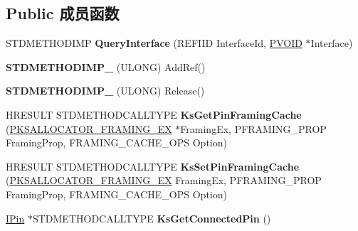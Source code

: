 \subsection*{Public 成员函数}
\begin{DoxyCompactItemize}
\item 
\mbox{\label{class_c_input_pin_a1411cd48b7dc135d980f56313519e106}} 
S\+T\+D\+M\+E\+T\+H\+O\+D\+I\+MP {\bfseries Query\+Interface} (R\+E\+F\+I\+ID Interface\+Id, \hyperlink{interfacevoid}{P\+V\+O\+ID} $\ast$Interface)
\item 
\mbox{\label{class_c_input_pin_a711a63c063067096b61be4d7bce940d7}} 
{\bfseries S\+T\+D\+M\+E\+T\+H\+O\+D\+I\+M\+P\+\_\+} (U\+L\+O\+NG) Add\+Ref()
\item 
\mbox{\label{class_c_input_pin_ac2713ee7beb47db650c95cd751c44d8d}} 
{\bfseries S\+T\+D\+M\+E\+T\+H\+O\+D\+I\+M\+P\+\_\+} (U\+L\+O\+NG) Release()
\item 
\mbox{\label{class_c_input_pin_a782a6def2d8a0433b147b9cd5c808eeb}} 
H\+R\+E\+S\+U\+LT S\+T\+D\+M\+E\+T\+H\+O\+D\+C\+A\+L\+L\+T\+Y\+PE {\bfseries Ks\+Get\+Pin\+Framing\+Cache} (\hyperlink{struct_k_s_a_l_l_o_c_a_t_o_r___f_r_a_m_i_n_g___e_x}{P\+K\+S\+A\+L\+L\+O\+C\+A\+T\+O\+R\+\_\+\+F\+R\+A\+M\+I\+N\+G\+\_\+\+EX} $\ast$Framing\+Ex, P\+F\+R\+A\+M\+I\+N\+G\+\_\+\+P\+R\+OP Framing\+Prop, F\+R\+A\+M\+I\+N\+G\+\_\+\+C\+A\+C\+H\+E\+\_\+\+O\+PS Option)
\item 
\mbox{\label{class_c_input_pin_a9aa7a402f9fcc1a4fbfac5da9c9cf75f}} 
H\+R\+E\+S\+U\+LT S\+T\+D\+M\+E\+T\+H\+O\+D\+C\+A\+L\+L\+T\+Y\+PE {\bfseries Ks\+Set\+Pin\+Framing\+Cache} (\hyperlink{struct_k_s_a_l_l_o_c_a_t_o_r___f_r_a_m_i_n_g___e_x}{P\+K\+S\+A\+L\+L\+O\+C\+A\+T\+O\+R\+\_\+\+F\+R\+A\+M\+I\+N\+G\+\_\+\+EX} Framing\+Ex, P\+F\+R\+A\+M\+I\+N\+G\+\_\+\+P\+R\+OP Framing\+Prop, F\+R\+A\+M\+I\+N\+G\+\_\+\+C\+A\+C\+H\+E\+\_\+\+O\+PS Option)
\item 
\mbox{\label{class_c_input_pin_a2d12faa2d38413fe6a839e6ea0dd398e}} 
\hyperlink{interface_i_pin}{I\+Pin} $\ast$S\+T\+D\+M\+E\+T\+H\+O\+D\+C\+A\+L\+L\+T\+Y\+PE {\bfseries Ks\+Get\+Connected\+Pin} ()
\item 
\mbox{\label{class_c_input_pin_a67be7ea5189953f2f184ef7b8bd72eed}} 

\end{DoxyCompactItemize}
